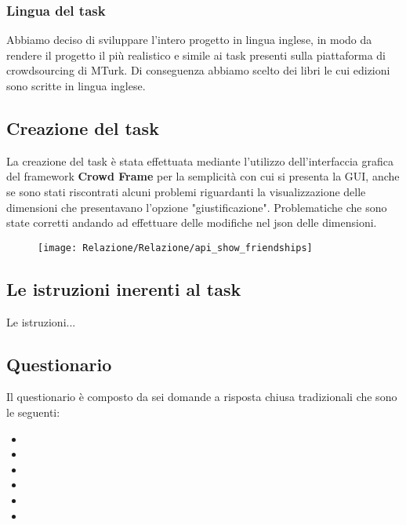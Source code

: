 \documentclass[a4paper,11pt]{report}
\begin{document}
\subsubsection{Lingua del task}
Abbiamo deciso di sviluppare l'intero progetto in lingua inglese, in modo da rendere il progetto il più realistico e simile ai task presenti sulla piattaforma di crowdsourcing di MTurk. Di conseguenza abbiamo scelto dei libri le cui edizioni sono scritte in lingua inglese.

\subsection{Creazione del task}
La creazione del task è stata effettuata mediante l'utilizzo dell'interfaccia grafica del framework \textbf{Crowd Frame} per la semplicità con cui si presenta la GUI, anche se sono stati riscontrati alcuni problemi riguardanti la visualizzazione delle dimensioni che presentavano l'opzione "giustificazione". Problematiche che sono state corretti andando ad effettuare delle modifiche nel json delle dimensioni. \\

\begin{figure}[h]
	\centering
	\texttt{[image: Relazione/Relazione/api\_show\_friendships]}
	\label{fig:apishowfriendships}
\end{figure}

\subsection{Le istruzioni inerenti al task}
Le istruzioni... 


\begin{figure}[h]
	\centering
	\label{fig:followers}
\end{figure}

\subsection{Questionario}
Il questionario è composto da sei domande a risposta chiusa tradizionali che sono le seguenti:
\begin{itemize}
	\item 
	\item 
	\item 
	\item 
	\item 
	\item 
\end{itemize}
\end{document}
